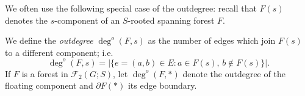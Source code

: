 \documentclass{amsart}
\theoremstyle{definition}
\newcommand{\forests}{\mathcal{F}}
\newcommand{\degout}{\deg^o}
\begin{document}
We often use the following special case of the outdegree: 
recall that $F(s)$ denotes the $s$-component of an $S$-rooted spanning forest $F$.

We define the {\em outdegree} $\degout(F,s)$ as the number of edges which join $F(s)$ to a different component; i.e.
\begin{equation}
\label{eq:outdeg-forest}
	\degout(F,s) = |\{ e = (a,b) \in E : a \in F(s),\, b \not\in F(s)\}|.
\end{equation}
If $F$ is a forest in $\forests_2(G;S)$, let $\degout(F,*)$ denote the outdegree of the floating component
and $\partial F(*)$ its edge boundary.
\end{document}
